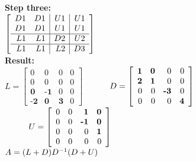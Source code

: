 \noindent \textbf{Step three:}\\

$
\left\lbrack\begin{array}{rr|r|r}
          D1&          D1&          U1&          U1\\
          D1&          D1&          U1&          U1\\ \hline
          L1&          L1&          D2&          U2\\ \hline
          L1&          L1&          L2&          D3
\end{array}\right\rbrack
\\$\\

\noindent \textbf{Result:}\\

$
L = 
\left\lbrack\begin{array}{rrrr}
           0&           0&           0&           0\\
           0&           0&           0&           0\\
   \textbf{0}& \textbf{-1}&          0&           0\\
  \textbf{-2}&  \textbf{0}&  \textbf{3}&          0
\end{array}\right\rbrack
$
$
\hspace{10mm} D =
\left\lbrack\begin{array}{rrrr}
   \textbf{1}&  \textbf{0}&          0&           0\\
   \textbf{2}&  \textbf{1}&          0&           0\\
           0&           0&  \textbf{-3}&          0\\
           0&           0&           0&   \textbf{4}
\end{array}\right\rbrack
$
$
\hspace{10mm} U =
\left\lbrack\begin{array}{rrrr}
           0&           0&   \textbf{1}&  \textbf{0}\\
           0&           0&  \textbf{-1}&  \textbf{0}\\
           0&           0&           0&   \textbf{1}\\
           0&           0&           0&           0
\end{array}\right\rbrack
\\$\\

$
\\
A = (L + D)D^{-1}(D + U)
$
